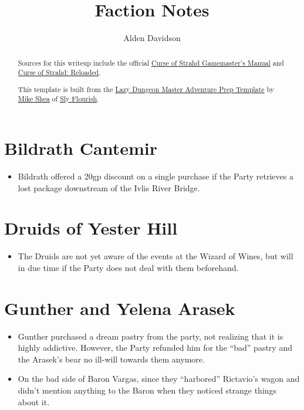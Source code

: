 \documentclass[a4paper,11pt]{article}
\title{Faction Notes}
\author{Alden Davidson}
\begin{document}
\maketitle
\tableofcontents

\begin{abstract}
  Sources for this writeup include the official
  \href{https://5e.tools/adventure.html#cos}{Curse of Strahd Gamemaster's Manual} and
  \href{https://www.reddit.com/r/CurseofStrahd/comments/9bpzbh/curse_of_strahd_reloaded_compilation_thread/}{Curse of Strahd: Reloaded}.
  
  This template is built from the
  \href{https://slyflourish.com/rotldm_template.html}{Lazy Dungeon Master Adventure Prep Template} by
  \href{https://slyflourish.com/about_mike_shea.html}{Mike Shea} of \href{https://slyflourish.com/}{Sly Flourish}.
\end{abstract}

\pagebreak
\section{Bildrath Cantemir}
\begin{itemize}
  \item Bildrath offered a 20gp discount on a single purchase if the Party retrieves a lost package downstream of
  the Ivlis River Bridge.
\end{itemize}

\section{Druids of Yester Hill}
\begin{itemize}
  \item The Druids are not yet aware of the events at the Wizard of Wines, but will in due time if the Party does 
  not deal with them beforehand.
\end{itemize}

\section{Gunther and Yelena Arasek}
\begin{itemize}
  \item Gunther purchased a dream pastry from the party, not realizing that it is highly addictive. However, the 
  Party refunded him for the ``bad'' pastry and the Arasek's bear no ill-will towards them anymore.
  \item On the bad side of Baron Vargas, since they ``harbored'' Rictavio's wagon and didn't mention anything to
  the Baron when they noticed strange things about it.
\end{itemize}
\end{document}
